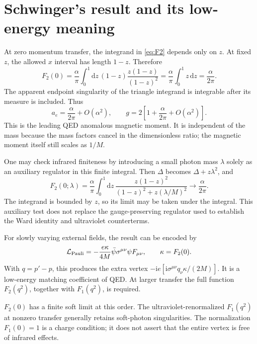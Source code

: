 \documentclass[11pt]{article}
\newcommand{\dd}{\mathrm d}
\newcommand{\ii}{\mathrm i}
\newcommand{\Lag}{\mathcal L}
\newcommand{\module}[1]{\clearpage\section{#1}}
\begin{document}
\module{Schwinger's result and its low-energy meaning}
At zero momentum transfer, the integrand in \eqref{eq:F2} depends only
on \(z\). At fixed \(z\), the allowed \(x\) interval has length \(1-z\).
Therefore
\begin{equation}
 F_2(0)=\frac{\alpha}{\pi}\int_0^1\dd z\,(1-z)
 \frac{z(1-z)}{(1-z)^2}
 =\frac{\alpha}{\pi}\int_0^1z\,\dd z
 =\frac{\alpha}{2\pi}.
\end{equation}
The apparent endpoint singularity of the triangle integrand is
integrable after its measure is included. Thus
\begin{equation}
 a_e=\frac{\alpha}{2\pi}+O(\alpha^2),\qquad
 g=2\left[1+\frac{\alpha}{2\pi}+O(\alpha^2)\right].
\end{equation}
This is the leading QED anomalous magnetic moment. It is independent of
the mass because the mass factors cancel in the dimensionless ratio;
the magnetic moment itself still scales as \(1/M\).

One may check infrared finiteness by introducing a small photon mass
\(\lambda\) solely as an auxiliary regulator in this finite integral.
Then \(\Delta\) becomes \(\Delta+z\lambda^2\), and
\begin{equation}
 F_2(0;\lambda)=\frac{\alpha}{\pi}\int_0^1\dd z\,
 \frac{z(1-z)^2}{(1-z)^2+z(\lambda/M)^2}
 \longrightarrow\frac{\alpha}{2\pi}.
\end{equation}
The integrand is bounded by \(z\), so its limit may be taken under the
integral. This auxiliary test does not replace the gauge-preserving
regulator used to establish the Ward identity and ultraviolet counterterms.

For slowly varying external fields, the result can be encoded by
\begin{equation}
 \Lag_{\rm Pauli}=-\frac{e\kappa}{4M}
 \bar\psi\sigma^{\mu\nu}\psi F_{\mu\nu},\qquad
 \kappa=F_2(0).
\end{equation}
With \(q=p'-p\), this produces the extra vertex
\(-\ii e[\ii\sigma^{\mu\nu}q_\nu\kappa/(2M)]\).
It is a low-energy matching coefficient of QED. At larger transfer the
full function \(F_2(q^2)\), together with \(F_1(q^2)\), is required.

\begin{remarkbox}
\(F_2(0)\) has a finite soft limit at this order. The ultraviolet-renormalized
\(F_1(q^2)\) at nonzero transfer generally retains soft-photon singularities.
The normalization \(F_1(0)=1\) is a charge condition; it does not assert
that the entire vertex is free of infrared effects.
\end{remarkbox}
\end{document}
